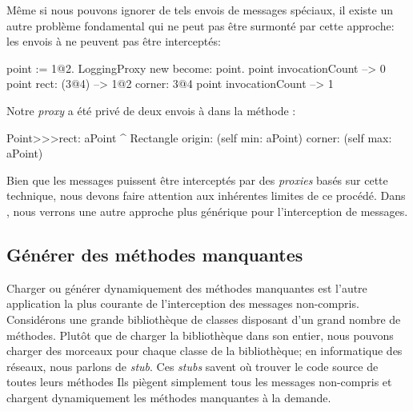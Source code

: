 \documentclass[a4paper,10pt,twoside]{book}
\begin{document}

Même si nous pouvons ignorer de tels envois de messages spéciaux, il existe un autre problème fondamental qui ne peut pas être surmonté par cette approche: les envois à \self ne peuvent pas être interceptés:
\begin{code}{}
point := 1@2.
LoggingProxy new become: point.
point invocationCount --> 0
point rect: (3@4)        --> 1@2 corner: 3@4
point invocationCount --> 1
\end{code}

\noindent{} Notre \emph{proxy} a été privé de deux envois à \self dans la méthode \mbox{:} 
\begin{code}{}
Point>>>rect: aPoint 
	^ Rectangle  origin: (self min: aPoint) corner: (self max: aPoint)
\end{code}

Bien que les messages puissent être interceptés par des \emph{proxies} basés sur cette technique, nous devons faire attention aux inhérentes limites de ce procédé. Dans , nous verrons une autre approche plus générique pour l'interception de messages.

\subsection{Générer des méthodes manquantes}

Charger ou générer dynamiquement des méthodes manquantes est 
l'autre application la plus courante de l'interception des messages non-compris.
Considérons une grande bibliothèque de classes disposant d'un grand nombre de méthodes. 
Plutôt que de charger la bibliothèque dans son entier, nous pouvons charger des morceaux 
pour chaque classe de la bibliothèque;
en informatique des réseaux, nous parlons de \emph{stub}.
Ces \emph{stubs} savent où trouver le code source de toutes leurs méthodes Ils piègent simplement tous les messages non-compris et chargent dynamiquement les méthodes manquantes à la demande.  
\end{document}
